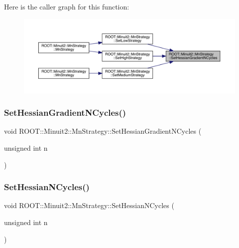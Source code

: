 Here is the caller graph for this function\+:
\nopagebreak
\begin{figure}[H]
\begin{center}
\leavevmode
\includegraphics[width=350pt]{da/de4/classROOT_1_1Minuit2_1_1MnStrategy_ad8984d94901eaf8cad19fe49647449bf_icgraph}
\end{center}
\end{figure}
\mbox{\label{classROOT_1_1Minuit2_1_1MnStrategy_ad8984d94901eaf8cad19fe49647449bf}} 
\subsubsection{\texorpdfstring{SetHessianGradientNCycles()}{SetHessianGradientNCycles()}\hspace{0.1cm}{\footnotesize\ttfamily [3/3]}}
{\footnotesize\ttfamily void R\+O\+O\+T\+::\+Minuit2\+::\+Mn\+Strategy\+::\+Set\+Hessian\+Gradient\+N\+Cycles (\begin{DoxyParamCaption}\item[{unsigned int}]{n }\end{DoxyParamCaption})\hspace{0.3cm}{\ttfamily [inline]}}

\mbox{\label{classROOT_1_1Minuit2_1_1MnStrategy_a7d97d197e18c686e2cdb826ea514de28}} 
\subsubsection{\texorpdfstring{SetHessianNCycles()}{SetHessianNCycles()}\hspace{0.1cm}{\footnotesize\ttfamily [1/3]}}
{\footnotesize\ttfamily void R\+O\+O\+T\+::\+Minuit2\+::\+Mn\+Strategy\+::\+Set\+Hessian\+N\+Cycles (\begin{DoxyParamCaption}\item[{unsigned int}]{n }\end{DoxyParamCaption})\hspace{0.3cm}{\ttfamily [inline]}}

